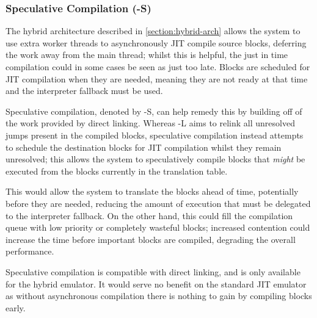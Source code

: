\subsubsection{Speculative Compilation (-S)}

The hybrid architecture described in \autoref{section:hybrid-arch} allows the system to use extra worker threads to asynchronously JIT compile source blocks, deferring the work away from the main thread; whilst this is helpful, the just in time compilation could in some cases be seen as just too late. Blocks are scheduled for JIT compilation when they are needed, meaning they are not ready at that time and the interpreter fallback must be used.

Speculative compilation, denoted by -S, can help remedy this by building off of the work provided by direct linking. Whereas -L aims to relink all unresolved jumps present in the compiled blocks, speculative compilation instead attempts to schedule the destination blocks for JIT compilation whilst they remain unresolved; this allows the system to speculatively compile blocks that \textit{might} be executed from the blocks currently in the translation table.

This would allow the system to translate the blocks ahead of time, potentially before they are needed, reducing the amount of execution that must be delegated to the interpreter fallback. On the other hand, this could fill the compilation queue with low priority or completely wasteful blocks; increased contention could increase the time before important blocks are compiled, degrading the overall performance.

Speculative compilation is compatible with direct linking, and is only available for the hybrid emulator. It would serve no benefit on the standard JIT emulator as without asynchronous compilation there is nothing to gain by compiling blocks early.